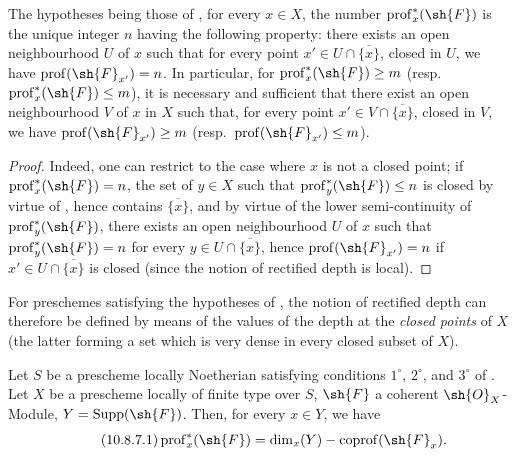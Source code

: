 \begin{corollary}[10.8.6]
\label{IV.10.8.6}
The hypotheses being those of , for every $x\in X$, the number $\operatorname{prof}^*_x(\sh{F})$ is the unique integer $n$ having the following property: there exists an open neighbourhood $U$ of $x$ such that for every point $x'\in U\cap\overline{\{x\}}$, closed in $U$, we have $\operatorname{prof}(\sh{F}_{x'})=n$.
In particular, for $\operatorname{prof}^*_x(\sh{F})\geq m$ (resp.\ $\operatorname{prof}^*_x(\sh{F})\leq m$), it is necessary and sufficient that there exist an open neighbourhood $V$ of $x$ in $X$ such that, for every point $x'\in V\cap\overline{\{x\}}$, closed in $V$, we have $\operatorname{prof}(\sh{F}_{x'})\geq m$ (resp.\ $\operatorname{prof}(\sh{F}_{x'})\leq m$).
\end{corollary}

\begin{proof}
Indeed, one can restrict to the case where $x$ is not a closed point; if $\operatorname{prof}^*_x(\sh{F})=n$, the set of $y\in X$ such that $\operatorname{prof}^*_y(\sh{F})\leq n$ is closed by virtue of , hence contains $\overline{\{x\}}$, and by virtue of the lower semi-continuity of $\operatorname{prof}^*_y(\sh{F})$, there exists an open neighbourhood $U$ of $x$ such that $\operatorname{prof}^*_y(\sh{F})=n$ for every $y\in U\cap\overline{\{x\}}$, hence $\operatorname{prof}(\sh{F}_{x'})=n$ if $x'\in U\cap\overline{\{x\}}$ is closed (since the notion of rectified depth is local).
\end{proof}

For preschemes satisfying the hypotheses of , the notion of rectified depth can therefore be defined by means of the values of the depth at the \emph{closed points} of $X$ (the latter forming a set which is very dense in every closed subset of $X$).

\begin{proposition}[10.8.7]
\label{IV.10.8.7}
Let $S$ be a prescheme locally Noetherian satisfying conditions $1^\circ$, $2^\circ$, and $3^\circ$ of .
Let $X$ be a prescheme locally of finite type over $S$, $\sh{F}$ a coherent $\sh{O}_X$-Module, $Y=\operatorname{Supp}(\sh{F})$.
Then, for every $x\in Y$, we have
\begin{equation}
\label{IV.10.8.7.1}
\tag{10.8.7.1}
\operatorname{prof}^*_x(\sh{F})=\dim_x(Y)-\operatorname{coprof}(\sh{F}_x).
\end{equation}
\end{proposition}

